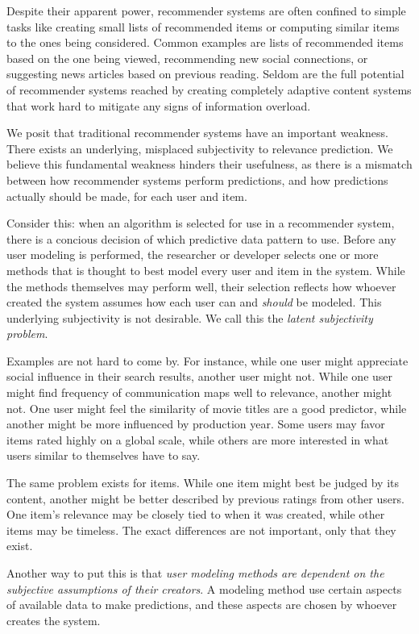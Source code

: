 Despite their apparent power, recommender systems are often confined
to simple tasks like creating small lists of recommended items
or computing similar items to the ones being considered.
Common examples are lists of recommended items based on the one being viewed, 
recommending new social connections, or suggesting news articles based on previous reading.
Seldom are the full potential of recommender systems reached by creating completely adaptive
content systems that work hard to mitigate any signs of information overload.

We posit that traditional recommender systems have an important weakness.
There exists an underlying, misplaced subjectivity to relevance prediction.
We believe this fundamental weakness hinders their usefulness,
as there is a mismatch between how recommender systems perform predictions,
and how predictions actually should be made, for each user and item.



Consider this: 
when an algorithm is selected for use in a recommender system,
there is a concious decision of which predictive data pattern to use.
Before any user modeling is performed, the researcher or developer selects
one or more methods that is thought to best model every user and item in the system.
While the methods themselves may perform well, their selection
reflects how whoever created the system assumes how each user
can and \emph{should} be modeled. This underlying subjectivity is not desirable.
We call this the \emph{latent subjectivity problem}.

Examples are not hard to come by.
For instance, while one user might appreciate social
influence in their search results, another user might not.
While one user might find frequency of communication maps well to relevance,
another might not. 
One user might feel the similarity of movie titles are a good predictor,
while another might be more influenced by production year.
Some users may favor items rated highly on a global scale,
while others are more interested in what users similar to themselves have to say.

The same problem exists for items. While one item might best be judged by its content,
another might be better described by previous ratings from other users.
One item's relevance may be closely tied to when it was created,
while other items may be timeless.
The exact differences are not important, only that they exist.

Another way to put this is that 
\emph{user modeling methods are dependent on the subjective assumptions of their creators}.
A modeling method use certain aspects of available data to make predictions,
and these aspects are chosen by whoever creates the system.

